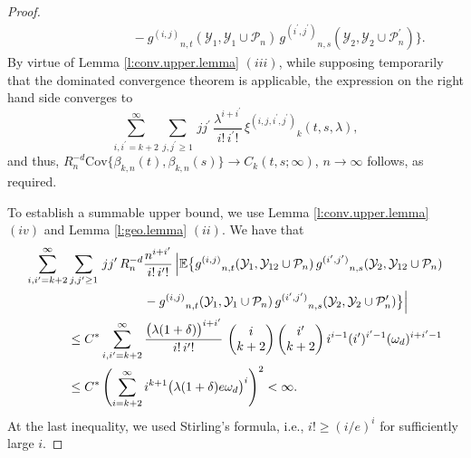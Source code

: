 \documentclass[11pt]{amsart}
\numberwithin{equation}{section}
\theoremstyle{plain}
\theoremstyle{definition}
\begin{document}
\begin{proof}
\begin{align*}
&\qquad \qquad \qquad - {g^{(i,j)}}_{n,t}({{\mathcal{Y}}}_1, {{\mathcal{Y}}}_1 \cup {\mathcal P_n})\, {g^{(i^{\prime},j^{\prime})}}_{n,s} ({{\mathcal{Y}}}_2, {{\mathcal{Y}}}_2 \cup {\mathcal P_n^{\prime}}) \bigr\}.
\end{align*}
By virtue of Lemma \ref{l:conv.upper.lemma} $(iii)$, while supposing temporarily that the dominated convergence theorem is applicable, the expression on the right hand side converges to
$$
\sum_{i,  {i^{\prime}} = k+2}^{\infty} \sum_{j, {j^{\prime}} \geq 1} \, j {j^{\prime}}\,  \frac{\lambda^{i+{i^{\prime}}}}{i!\, {i^{\prime}} !}\, {\xi^{(i,j,{i^{\prime}},{j^{\prime}})}}_k(t,s,\lambda),
$$
and thus, $R_n^{-d} \text{Cov} \bigl\{ \beta_{k,n}(t), \beta_{k,n}(s) \bigr\} \to C_k(t,s; \infty)$, $n\to\infty$ follows, as required.

To establish a summable upper bound, we use Lemma \ref{l:conv.upper.lemma} $(iv)$ and Lemma \ref{l:geo.lemma} $(ii)$. We have that
\begin{align*}
\sum_{i,  {i^{\prime}} = k+2}^{\infty} &\sum_{j, {j^{\prime}} \geq 1} \, j {j^{\prime}}\, R_n^{-d} \frac{n^{i+{i^{\prime}}}}{i!\, {i^{\prime}}!}\, \Bigl| {\mathbb{E}} \bigl\{ {g^{(i,j)}}_{n,t}({{\mathcal{Y}}}_1, {{\mathcal{Y}}}_{12} \cup {\mathcal P_n})\, {g^{(i^{\prime},j^{\prime})}}_{n,s} ({{\mathcal{Y}}}_2, {{\mathcal{Y}}}_{12} \cup {\mathcal P_n}) \\
&\qquad \qquad \qquad - {g^{(i,j)}}_{n,t}({{\mathcal{Y}}}_1, {{\mathcal{Y}}}_1 \cup {\mathcal P_n})\, {g^{(i^{\prime},j^{\prime})}}_{n,s} ({{\mathcal{Y}}}_2, {{\mathcal{Y}}}_2 \cup {\mathcal P_n^{\prime}}) \bigr\} \Bigr|  \\
&\leq C^* \sum_{i,  {i^{\prime}} = k+2}^{\infty} \frac{\bigl( \lambda(1+\delta) \bigr)^{i+{i^{\prime}}}}{i!\, {i^{\prime}}!}\, \begin{pmatrix} i \\ k+2 \end{pmatrix} \begin{pmatrix} {i^{\prime}} \\ k+2 \end{pmatrix} i^{i-1} ({i^{\prime}})^{{i^{\prime}} -1} (\omega_d)^{i+{i^{\prime}}-1} \\
&\leq C^* \left( \sum_{i=k+2}^\infty i^{k+1} \bigl( \lambda(1+\delta) e \omega_d \bigr)^i \right)^2 < \infty.
\end{align*}
At the last inequality, we used Stirling's formula, i.e., $i! \geq (i/e)^i$ for sufficiently large $i$.
\end{proof}
\end{document}
